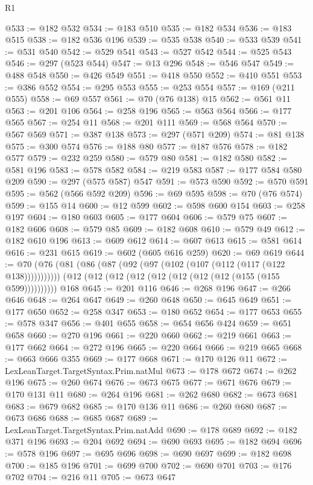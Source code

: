 \begin{lexlean}{R1}
\begin{coremodule}
@533 := @182 @532
@534 := @183 @510
@535 := @182 @534
@536 := @183 @515
@538 := @182 @536 @196
@539 := @535 @538
@540 := @533 @539
@541 := @531 @540
@542 := @529 @541
@543 := @527 @542
@544 := @525 @543
@546 := @297 (@523 @544)
@547 := @13 @296
@548 := @546 @547
@549 := @488 @548
@550 := @426 @549
@551 := @418 @550
@552 := @410 @551
@553 := @386 @552
@554 := @295 @553
@555 := @253 @554
@557 := @169 (@211 @555)
@558 := @69 @557
@561 := @70 (@76 @138) @15
@562 := @561 @11
@563 := @201 @106
@564 := @258 @196
@565 := @563 @564
@566 := @177 @565
@567 := @254 @11
@568 := @201 @111
@569 := @568 @564
@570 := @567 @569
@571 := @387 @138
@573 := @297 (@571 @209)
@574 := @81 @138
@575 := @300 @574
@576 := @188 @80
@577 := @187 @576
@578 := @182 @577
@579 := @232 @259
@580 := @579 @80
@581 := @182 @580
@582 := @581 @196
@583 := @578 @582
@584 := @219 @583
@587 := @177 @584 @580 @209
@590 := @297 (@575 @587) @547
@591 := @573 @590
@592 := @570 @591
@595 := @562 (@566 @592 @209)
@596 := @69 @595
@598 := @70 (@76 @574)
@599 := @155 @14
@600 := @12 @599
@602 := @598 @600 @154
@603 := @258 @197
@604 := @180 @603
@605 := @177 @604
@606 := @579 @75
@607 := @182 @606
@608 := @579 @85
@609 := @182 @608
@610 := @579 @49
@612 := @182 @610 @196
@613 := @609 @612
@614 := @607 @613
@615 := @581 @614
@616 := @231 @615
@619 := @602 (@605 @616 @259)
@620 := @69 @619
@644 := @70
    (@76 (@81 (@86 (@87 (@92 (@97 (@102 (@107 (@112 (@117 (@122 @138)))))))))))
    (@12 (@12 (@12 (@12 (@12 (@12 (@12 (@12 (@155 (@155 @599))))))))))
    @168
@645 := @201 @116
@646 := @268 @196
@647 := @266 @646
@648 := @264 @647
@649 := @260 @648
@650 := @645 @649
@651 := @177 @650
@652 := @258 @347
@653 := @180 @652
@654 := @177 @653
@655 := @578 @347
@656 := @401 @655
@658 := @654 @656 @424
@659 := @651 @658
@660 := @270 @196
@661 := @220 @660
@662 := @219 @661
@663 := @177 @662
@664 := @272 @196
@665 := @220 @664
@666 := @219 @665
@668 := @663 @666 @355
@669 := @177 @668
@671 := @170 @126 @11
@672 := LexLeanTarget.TargetSyntax.Prim.natMul
@673 := @178 @672
@674 := @262 @196
@675 := @260 @674
@676 := @673 @675
@677 := @671 @676
@679 := @170 @131 @11
@680 := @264 @196
@681 := @262 @680
@682 := @673 @681
@683 := @679 @682
@685 := @170 @136 @11
@686 := @260 @680
@687 := @673 @686
@688 := @685 @687
@689 := LexLeanTarget.TargetSyntax.Prim.natAdd
@690 := @178 @689
@692 := @182 @371 @196
@693 := @204 @692
@694 := @690 @693
@695 := @182 @694
@696 := @578 @196
@697 := @695 @696
@698 := @690 @697
@699 := @182 @698
@700 := @185 @196
@701 := @699 @700
@702 := @690 @701
@703 := @176 @702
@704 := @216 @11
@705 := @673 @647

\end{coremodule}
\end{lexlean}
